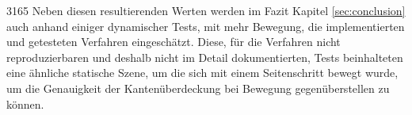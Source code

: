3165
Neben diesen resultierenden Werten werden im Fazit Kapitel \ref{sec:conclusion} auch anhand einiger dynamischer Tests, mit mehr Bewegung, die implementierten und getesteten Verfahren eingeschätzt. Diese, für die Verfahren nicht reproduzierbaren und deshalb nicht im Detail dokumentierten, Tests beinhalteten eine ähnliche statische Szene, um die sich mit einem Seitenschritt bewegt wurde, um die Genauigkeit der Kantenüberdeckung bei Bewegung gegenüberstellen zu können.